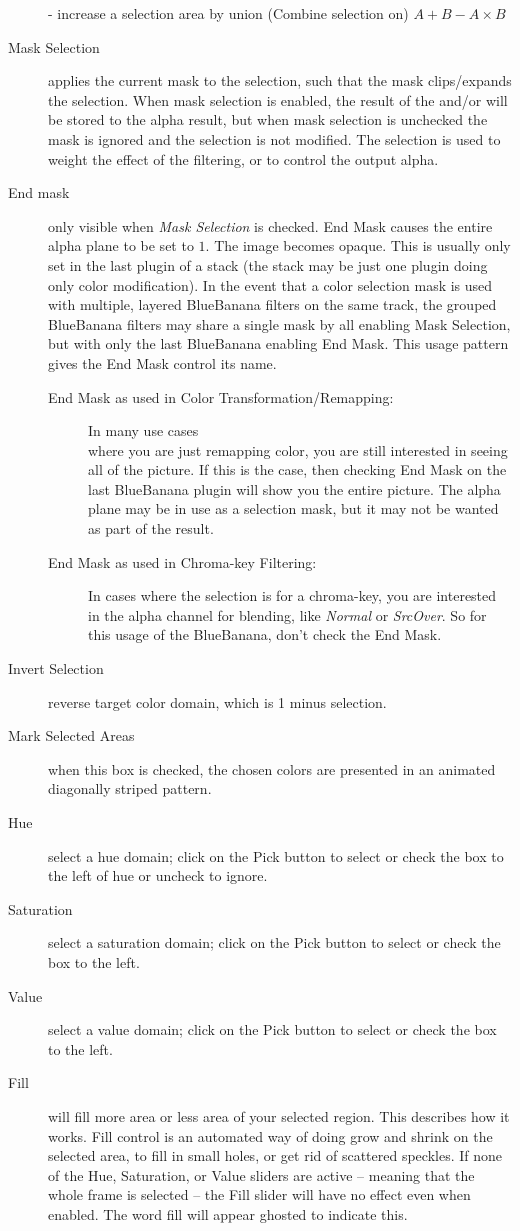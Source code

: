 \begin{description}
    - increase a selection area by union (Combine selection on) $A+B-A\times B$
    \item[Mask Selection] applies the current mask to the selection, such that the mask clips/expands the selection. When mask selection is enabled, the result of the and/or will be stored to the alpha result, but when mask selection is unchecked the mask is ignored and the selection is not modified. The selection is used to weight the effect of the filtering, or to control the output alpha.
    \item[End mask] only visible when \textit{Mask Selection} is checked. End Mask causes the entire alpha plane to
    be set to $1$. The image becomes opaque. This is usually only set in the last plugin of a stack (the stack may be just one plugin doing only color modification). In the event that a color selection mask is used with multiple, layered BlueBanana filters on the same track, the grouped BlueBanana filters may share a single mask by all enabling Mask Selection, but with only the last BlueBanana enabling End Mask. This usage pattern gives the End Mask control its name.
    \begin{description}
        \item[End Mask as used in Color Transformation/Remapping:] In many use cases \\
        where you are just remapping color, you are still interested in seeing all of the picture. If this is the case, then checking End Mask on the last BlueBanana plugin will show you the entire picture. The alpha plane may be in use as a selection mask, but it may not be wanted as part of the result.
        \item[End Mask as used in Chroma-key Filtering:] In cases where the selection is for a chroma-key, you are interested in the alpha channel for blending, like \textit{Normal} or \textit{SrcOver}. So for this usage of the BlueBanana, don't check the End Mask.
    \end{description}
    \item[Invert Selection] reverse target color domain, which is 1 minus selection.
    \item[Mark Selected Areas] when this box is checked, the chosen colors are presented in an animated
    diagonally striped pattern.
    \item[Hue] select a hue domain; click on the Pick button to select or check the box to the left of hue or uncheck to ignore.
    \item[Saturation] select a saturation domain; click on the Pick button to select or check the box to the left.
    \item[Value] select a value domain; click on the Pick button to select or check the box to the left.
    \item[Fill] will fill more area or less area of your selected region. This describes how it works. Fill control is an automated way of doing grow and shrink on the selected area, to fill in small holes, or get rid of scattered speckles. If none of the Hue, Saturation, or Value sliders are active -- meaning that the whole frame is selected -- the Fill slider will have no effect even when enabled. The word fill will appear ghosted to indicate this.


\end{description}
